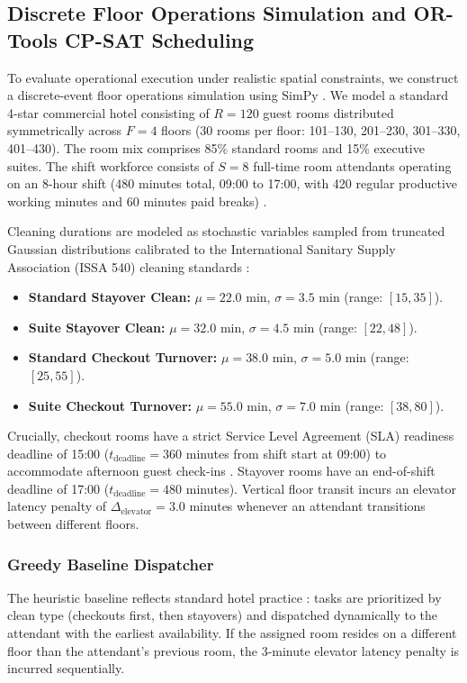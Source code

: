 \documentclass[11pt,a4paper]{article}
\begin{document}
\subsection{Discrete Floor Operations Simulation and OR-Tools CP-SAT Scheduling}
To evaluate operational execution under realistic spatial constraints, we construct a discrete-event floor operations simulation using SimPy \cite{castillo2006,simpy2020}. We model a standard 4-star commercial hotel consisting of $R = 120$ guest rooms distributed symmetrically across $F = 4$ floors (30 rooms per floor: 101--130, 201--230, 301--330, 401--430). The room mix comprises 85\% standard rooms and 15\% executive suites. The shift workforce consists of $S = 8$ full-time room attendants operating on an 8-hour shift (480 minutes total, 09:00 to 17:00, with 420 regular productive working minutes and 60 minutes paid breaks) \cite{issa2020,bls2024}.

Cleaning durations are modeled as stochastic variables sampled from truncated Gaussian distributions calibrated to the International Sanitary Supply Association (ISSA 540) cleaning standards \cite{issa2020}:
\begin{itemize}
    \item \textbf{Standard Stayover Clean:} $\mu = 22.0$ min, $\sigma = 3.5$ min (range: $[15, 35]$).
    \item \textbf{Suite Stayover Clean:} $\mu = 32.0$ min, $\sigma = 4.5$ min (range: $[22, 48]$).
    \item \textbf{Standard Checkout Turnover:} $\mu = 38.0$ min, $\sigma = 5.0$ min (range: $[25, 55]$).
    \item \textbf{Suite Checkout Turnover:} $\mu = 55.0$ min, $\sigma = 7.0$ min (range: $[38, 80]$).
\end{itemize}

Crucially, checkout rooms have a strict Service Level Agreement (SLA) readiness deadline of 15:00 ($t_{\text{deadline}} = 360$ minutes from shift start at 09:00) to accommodate afternoon guest check-ins \cite{kimes2004}. Stayover rooms have an end-of-shift deadline of 17:00 ($t_{\text{deadline}} = 480$ minutes). Vertical floor transit incurs an elevator latency penalty of $\Delta_{\text{elevator}} = 3.0$ minutes whenever an attendant transitions between different floors.

\subsubsection{Greedy Baseline Dispatcher}
The heuristic baseline reflects standard hotel practice \cite{chan2013,hancer2003}: tasks are prioritized by clean type (checkouts first, then stayovers) and dispatched dynamically to the attendant with the earliest availability. If the assigned room resides on a different floor than the attendant's previous room, the 3-minute elevator latency penalty is incurred sequentially.
\end{document}
